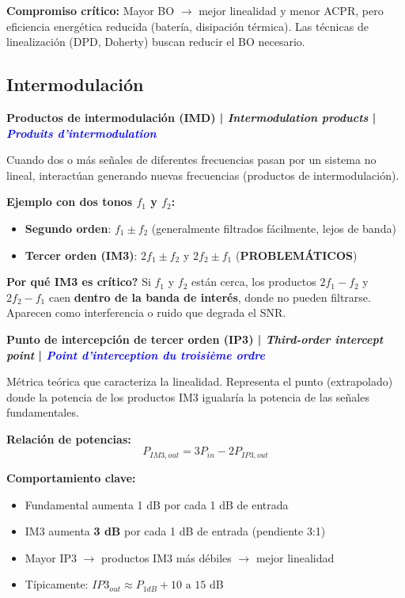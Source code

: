 \documentclass[a4paper,10pt]{article}
\begin{document}
\textbf{Compromiso cr\'itico:} Mayor BO $\rightarrow$ mejor linealidad y menor ACPR, pero eficiencia energ\'etica reducida (bater\'ia, disipaci\'on t\'ermica). Las t\'ecnicas de linealizaci\'on (DPD, Doherty) buscan reducir el BO necesario.

\subsection{Intermodulaci\'on}

\textbf{Productos de intermodulaci\'on (IMD) | \textit{Intermodulation products} | \textcolor{blue}{\textit{Produits d'intermodulation}}}

Cuando dos o m\'as se\~nales de diferentes frecuencias pasan por un sistema no lineal, interact\'uan generando nuevas frecuencias (productos de intermodulaci\'on).

\textbf{Ejemplo con dos tonos $f_1$ y $f_2$:}
\begin{itemize}[leftmargin=*]
    \item \textbf{Segundo orden}: $f_1 \pm f_2$ (generalmente filtrados f\'acilmente, lejos de banda)
    \item \textbf{Tercer orden (IM3)}: $2f_1 \pm f_2$ y $2f_2 \pm f_1$ (\textbf{PROBLEM\'ATICOS})
\end{itemize}

\textbf{\textquestiondown Por qu\'e IM3 es cr\'itico?} Si $f_1$ y $f_2$ est\'an cerca, los productos $2f_1-f_2$ y $2f_2-f_1$ caen \textbf{dentro de la banda de inter\'es}, donde no pueden filtrarse. Aparecen como interferencia o ruido que degrada el SNR.

\textbf{Punto de intercepci\'on de tercer orden (IP3) | \textit{Third-order intercept point} | \textcolor{blue}{\textit{Point d'interception du troisi\`eme ordre}}}

M\'etrica te\'orica que caracteriza la linealidad. Representa el punto (extrapolado) donde la potencia de los productos IM3 igualar\'ia la potencia de las se\~nales fundamentales.

\textbf{Relaci\'on de potencias:}
$$P_{IM3,out} = 3P_{in} - 2P_{IP3,out}$$

\textbf{Comportamiento clave:}
\begin{itemize}[leftmargin=*]
    \item Fundamental aumenta 1 dB por cada 1 dB de entrada
    \item IM3 aumenta \textbf{3 dB} por cada 1 dB de entrada (pendiente 3:1)
    \item Mayor IP3 $\rightarrow$ productos IM3 m\'as d\'ebiles $\rightarrow$ mejor linealidad
    \item T\'ipicamente: $IP3_{out} \approx P_{1dB} + 10\text{ a }15$ dB
\end{itemize}
\end{document}

